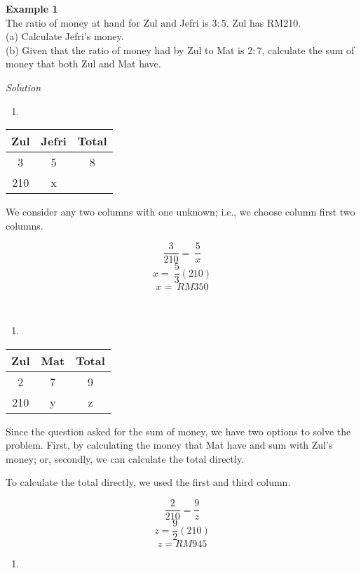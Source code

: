 \documentclass[
]{book}
\providecommand{\tightlist}{%
  \setlength{\itemsep}{0pt}\setlength{\parskip}{0pt}}
\begin{document}
\textbf{Example 1}\\
The ratio of money at hand for Zul and Jefri is \(3:5\). Zul has RM210.\\
(a) Calculate Jefri's money.\\
(b) Given that the ratio of money had by Zul to Mat is \(2:7\), calculate the sum of money that both Zul and Mat have.

\emph{Solution}

\begin{enumerate}
\def\labelenumi{(\alph{enumi})}
\tightlist
\item
\end{enumerate}

\begin{longtable}[]{@{}ccc@{}}
\toprule
Zul & Jefri & Total \\
\midrule
\endhead
3 & 5 & 8 \\
210 & x & \\
\bottomrule
\end{longtable}

We consider any two columns with one unknown; i.e., we choose column first two columns.

\[\frac{3}{210} =\ \frac{5}{x}\]
\[x =\ \frac{5}{3}(210)\]
\[x =\ RM350\]

~

\begin{enumerate}
\def\labelenumi{(\alph{enumi})}
\setcounter{enumi}{1}
\tightlist
\item
\end{enumerate}

\begin{longtable}[]{@{}ccc@{}}
\toprule
Zul & Mat & Total \\
\midrule
\endhead
2 & 7 & 9 \\
210 & y & z \\
\bottomrule
\end{longtable}

Since the question asked for the sum of money, we have two options to solve the problem. First, by calculating the money that Mat have and sum with Zul's money; or, secondly, we can calculate the total directly.

To calculate the total directly, we used the first and third column.

\[\frac{2}{210}=\frac{9}{z}\]
\[z=\frac{9}{2}(210)\]
\[z=RM945\]

\begin{enumerate}
\def\labelenumi{(\alph{enumi})}
\tightlist
\item
\end{enumerate}
\end{document}

